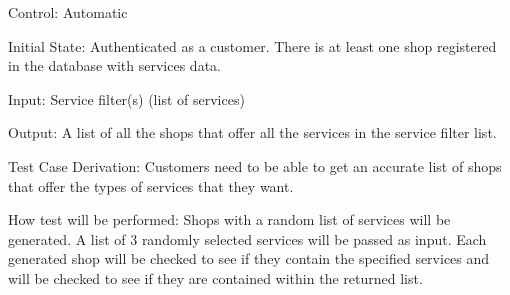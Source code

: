 \documentclass[12pt, titlepage]{article}
\begin{document}
\begin{enumerate}
                Control: Automatic \par
                Initial State: Authenticated as a customer. There is at least one shop registered in the database with services data. \par
                Input: Service filter(s) (list of services)\par
                Output: A list of all the shops that offer all the services in the service filter list.\par
                Test Case Derivation: Customers need to be able to get an accurate list of shops that offer the types of services that they want.\par
                How test will be performed: Shops with a random list of services will be generated. A list of 3 randomly selected services will be passed as input. Each generated shop will be checked to see if they contain the specified services and will be checked to see if they are contained within the returned list.\par
        \end{enumerate}
\end{document}
